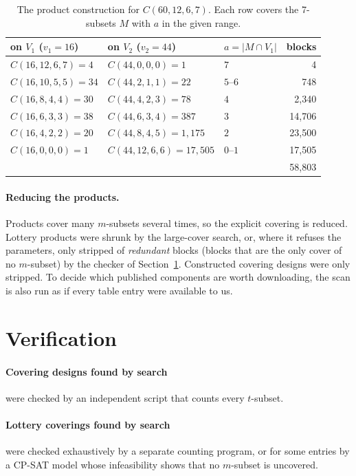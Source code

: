 \documentclass[11pt]{article}
\theoremstyle{remark}
\begin{document}
\begin{table}[t]
\centering
\begin{tabular}{lllr}
\toprule
on $V_1$ ($v_1=16$) & on $V_2$ ($v_2=44$) & $a=|M\cap V_1|$ & blocks \\
\midrule
$C(16,12,6,7)=4$ & $C(44,0,0,0)=1$ & $7$ & 4 \\
$C(16,10,5,5)=34$ & $C(44,2,1,1)=22$ & $5$--$6$ & 748 \\
$C(16,8,4,4)=30$ & $C(44,4,2,3)=78$ & $4$ & 2{,}340 \\
$C(16,6,3,3)=38$ & $C(44,6,3,4)=387$ & $3$ & 14{,}706 \\
$C(16,4,2,2)=20$ & $C(44,8,4,5)=1{,}175$ & $2$ & 23{,}500 \\
$C(16,0,0,0)=1$ & $C(44,12,6,6)=17{,}505$ & $0$--$1$ & 17{,}505 \\
\midrule
 & & & 58{,}803 \\
\bottomrule
\end{tabular}
\caption{The product construction for $C(60,12,6,7)$. Each row covers the 7-subsets $M$ with $a$ in the given range.}
\label{tab:example}
\end{table}

\paragraph{Reducing the products.} Products cover many $m$-subsets several times, so the explicit covering is
reduced. Lottery products were shrunk by the large-cover search, or, where it refuses the parameters, only stripped of
\emph{redundant} blocks (blocks that are the only cover of no $m$-subset) by the checker of Section~\ref{sec:verify}.
Constructed covering designs were only stripped. To decide which published components are worth downloading, the
scan is also run as if every table entry were available to us.

\section{Verification}\label{sec:verify}

\paragraph{Covering designs found by search} were checked by an independent script that counts every $t$-subset.

\paragraph{Lottery coverings found by search} were checked exhaustively by a separate counting program, or for some
entries by a CP-SAT model whose infeasibility shows that no $m$-subset is uncovered.
\end{document}
